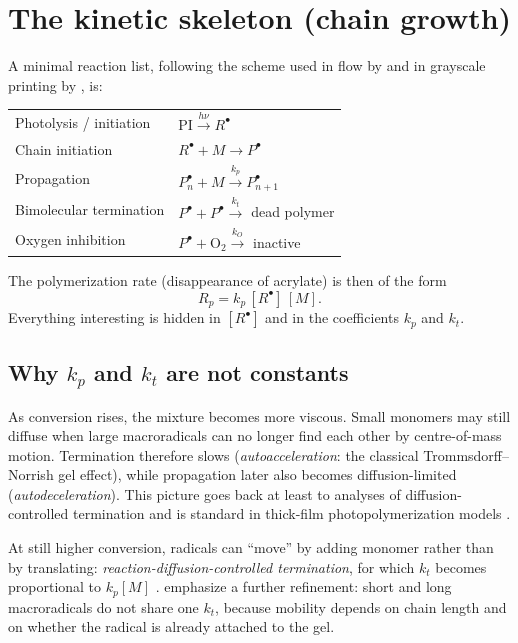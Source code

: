 \documentclass[11pt,a4paper]{article}
\begin{document}
\section{The kinetic skeleton (chain growth)}

A minimal reaction list, following the scheme used in flow by \citet{Slutzky2019} and in grayscale printing by \citet{Montgomery2022}, is:

\begin{center}
\begin{tabular}{@{}ll@{}}
\toprule
Photolysis / initiation & $\mathrm{PI} \xrightarrow{h\nu} R^\bullet$ \\
Chain initiation        & $R^\bullet + M \rightarrow P^\bullet$ \\
Propagation             & $P^\bullet_n + M \xrightarrow{k_p} P^\bullet_{n+1}$ \\
Bimolecular termination & $P^\bullet + P^\bullet \xrightarrow{k_t}$ dead polymer \\
Oxygen inhibition       & $P^\bullet + \mathrm{O}_2 \xrightarrow{k_O}$ inactive \\
\bottomrule
\end{tabular}
\end{center}

The polymerization rate (disappearance of acrylate) is then of the form
\begin{equation}
  R_p = k_p\,[R^\bullet]\,[M].
  \label{eq:Rp}
\end{equation}
Everything interesting is hidden in $[R^\bullet]$ and in the coefficients $k_p$ and $k_t$.

\subsection{\texorpdfstring{Why $k_p$ and $k_t$ are not constants}{Why kp and kt are not constants}}

As conversion rises, the mixture becomes more viscous.
Small monomers may still diffuse when large macroradicals can no longer find each other by centre-of-mass motion.
Termination therefore slows (\emph{autoacceleration}: the classical Trommsdorff--Norrish gel effect), while propagation later also becomes diffusion-limited (\emph{autodeceleration}).
This picture goes back at least to analyses of diffusion-controlled termination \citep{Benson1959} and is standard in thick-film photopolymerization models \citep{Goodner2002,Anseth1994}.

At still higher conversion, radicals can ``move'' by adding monomer rather than by translating: \emph{reaction-diffusion-controlled termination}, for which $k_t$ becomes proportional to $k_p[M]$ \citep{Anseth1994,Dobson2024,Montgomery2022}.
\citet{Dobson2024} emphasize a further refinement: short and long macroradicals do not share one $k_t$, because mobility depends on chain length and on whether the radical is already attached to the gel.
\end{document}
